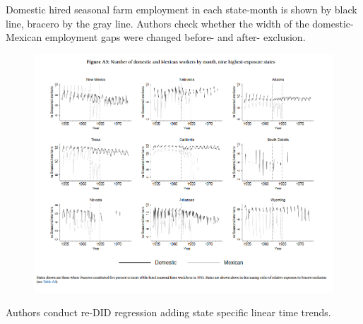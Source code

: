 \documentclass[../root]{subfiles}
\begin{document}
    Domestic hired seasonal farm employment in each state-month is shown by black line, bracero by the gray line. Authors check whether the width of the domestic-Mexican employment gaps were changed before- and after- exclusion.     
    \begin{figure}
        \centering
        \includegraphics[width = \linewidth]{0731sugiyama/FigureA3.png}
        \label{fig:my_label}
    \end{figure}
    Authors conduct re-DID regression adding state specific linear time trends.
    
\end{document}
